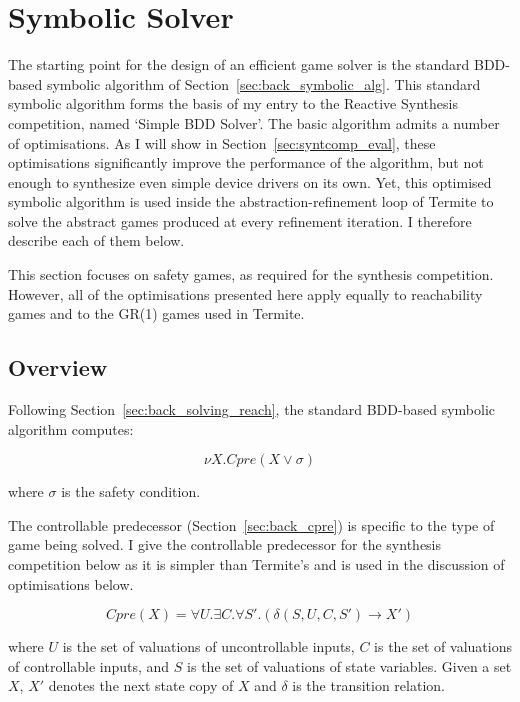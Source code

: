 \section{Symbolic Solver}
\label{sec:syntcomp}

The starting point for the design of an efficient game solver is the standard BDD-based symbolic algorithm of Section~\ref{sec:back_symbolic_alg}. This standard symbolic algorithm forms the basis of my entry to the Reactive Synthesis competition, named `Simple BDD Solver'. The basic algorithm admits a number of optimisations. As I will show in Section~\ref{sec:syntcomp_eval}, these optimisations significantly improve the performance of the algorithm, but not enough to synthesize even simple device drivers on its own. Yet, this optimised symbolic algorithm is used inside the abstraction-refinement loop of Termite to solve the abstract games produced at every refinement iteration. I therefore describe each of them below.

This section focuses on safety games, as required for the synthesis competition. However, all of the optimisations presented here apply equally to reachability games and to the GR(1) games used in Termite. 

\subsection{Overview}
Following Section~\ref{sec:back_solving_reach}, the standard BDD-based symbolic algorithm computes:

\begin{equation}
\label{eqn:mu_syntcomp}
\nu X. Cpre(X \lor \sigma)
\end{equation}

\noindent where $\sigma$ is the safety condition.

The controllable predecessor (Section~\ref{sec:back_cpre}) is specific to the type of game being solved. I give the controllable predecessor for the synthesis competition below as it is simpler than Termite's and is used in the discussion of optimisations below.

\begin{equation}
\label{eqn:cpre_syntcomp}
Cpre(X) = \forall U. \exists C. \forall S'. (\delta(S, U, C, S') \rightarrow X')
\end{equation}

\noindent where $U$ is the set of valuations of uncontrollable inputs, $C$ is the set of valuations of controllable inputs, and $S$ is the set of valuations of state variables. Given a set $X$, $X'$ denotes the next state copy of $X$ and $\delta$ is the transition relation.

